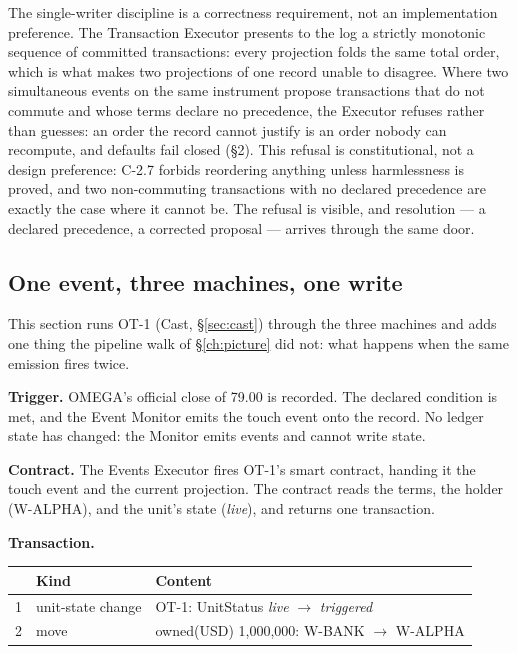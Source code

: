 The single-writer discipline is a correctness requirement, not an
implementation preference. The Transaction Executor presents to the log a
strictly monotonic sequence of committed transactions: every projection folds
the same total order, which is what makes two projections of one record unable
to disagree. Where two simultaneous events on the same instrument propose
transactions that do not commute and whose terms declare no precedence, the
Executor refuses rather than guesses: an order the record cannot justify is an
order nobody can recompute, and defaults fail closed (\S2). This refusal is
constitutional, not a design preference: C-2.7 forbids reordering anything unless
harmlessness is proved, and two non-commuting transactions with no declared
precedence are exactly the case where it cannot be. The refusal is
visible, and resolution --- a declared precedence, a corrected proposal ---
arrives through the same door.

\subsection{One event, three machines, one write}

This section runs OT-1 (Cast, \S\ref{sec:cast}) through the three machines and adds one
thing the pipeline walk of \S\ref{ch:picture} did not: what happens when the same emission
fires twice.

\textbf{Trigger.} OMEGA's official close of 79.00 is recorded. The declared
condition is met, and the Event Monitor emits the touch event onto the record.
No ledger state has changed: the Monitor emits events and cannot write state.

\textbf{Contract.} The Events Executor fires OT-1's smart contract, handing it
the touch event and the current projection. The contract reads the terms, the
holder (\mbox{W-ALPHA}), and the unit's state (\emph{live}), and returns one
transaction.

\textbf{Transaction.}

\begin{center}
\begin{tabular}{@{}rll@{}}
\toprule
 & Kind & Content \\
\midrule
1 & unit-state change & OT-1: UnitStatus \emph{live} $\to$ \emph{triggered} \\
2 & move & owned(USD) 1{,}000{,}000: W-BANK $\to$ W-ALPHA \\
\bottomrule
\end{tabular}
\end{center}

